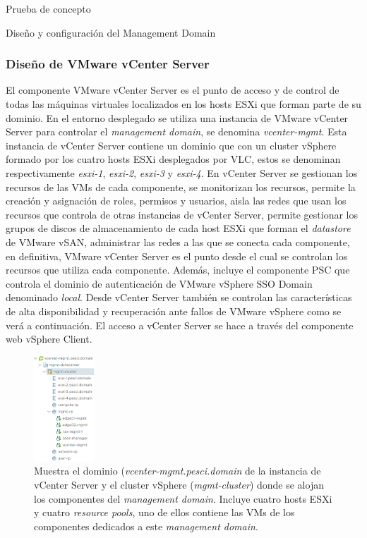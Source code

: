 \begin{section}{Prueba de concepto}
\begin{subsection}{Diseño y configuración del Management Domain}
    \subsubsection{Diseño de VMware vCenter Server}
    El componente VMware vCenter Server es el punto de acceso y de control de todas las máquinas virtuales localizados en los hosts ESXi que forman parte de su dominio. En el entorno desplegado se utiliza una instancia de VMware vCenter Server para controlar el \textit{management domain}, se denomina \textit{vcenter-mgmt}. Esta instancia de vCenter Server contiene un dominio que con un cluster vSphere formado por los cuatro hosts ESXi desplegados por VLC, estos se denominan respectivamente \textit{esxi-1}, \textit{esxi-2}, \textit{esxi-3} y \textit{esxi-4}. En vCenter Server se gestionan los recursos de las VMs de cada componente, se monitorizan los recursos, permite la creación y asignación de roles, permisos y usuarios, aisla las redes que usan los recursos que controla de otras instancias de vCenter Server, permite gestionar los grupos de discos de almacenamiento de cada host ESXi que forman el \textit{datastore} de VMware vSAN, administrar las redes a las que se conecta cada componente, en definitiva, VMware vCenter Server es el punto desde el cual se controlan los recursos que utiliza cada componente. Además, incluye el componente PSC que controla el dominio de autenticación de VMware vSphere SSO Domain denominado \textit{local}. Desde vCenter Server también se controlan las características de alta disponibilidad y recuperación ante fallos de VMware vSphere como se verá a continuación. El acceso a vCenter Server se hace a través del componente web vSphere Client.
    \begin{figure}[h]
      \centering
      \includegraphics[width=0.2\textwidth]{imaxes/pruebaconcepto/clusterVCenterServer.png}
      \caption{Muestra el dominio (\textit{vcenter-mgmt.pesci.domain} de la instancia de vCenter Server y el cluster vSphere (\textit{mgmt-cluster}) donde se alojan los componentes del \textit{management domain}. Incluye cuatro hosts ESXi y cuatro \textit{resource pools}, uno de ellos contiene las VMs de los componentes dedicados a este \textit{management domain}.}

\end{figure}
\end{subsection}
\end{section}
